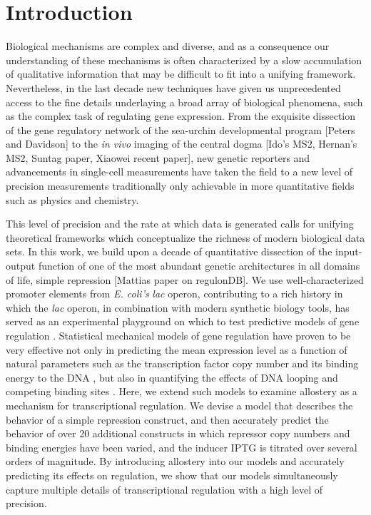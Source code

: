 \section*{Introduction }

Biological mechanisms are complex and diverse, and as a consequence our understanding of these mechanisms is often characterized by a slow accumulation of qualitative information that may be difficult to fit into a unifying framework. Nevertheless, in the last decade new techniques have given us unprecedented access to the fine details underlaying a broad array of biological phenomena, such as the complex task of regulating gene expression. From the exquisite dissection of the gene regulatory
network of the sea-urchin developmental program [Peters and Davidson] to the
\textit{in vivo} imaging of the central dogma [Ido's MS2, Hernan's MS2, Suntag
paper, Xiaowei recent paper], new genetic reporters and  advancements in
single-cell measurements have taken the field to a new level of precision
measurements traditionally only achievable in more quantitative fields such as
physics and chemistry.

This level of precision and the rate at which data is generated calls for
unifying theoretical frameworks which conceptualize the richness of modern
biological data sets. In this work, we build upon a decade of quantitative
dissection of the input-output function of one of the most abundant genetic
architectures in all domains of life, simple repression [Mattias paper on
regulonDB]. We use well-characterized promoter elements from \textit{E. coli's} \textit{lac} operon, contributing to a rich history in which the \textit{lac} operon, in combination with modern synthetic biology
tools, has served as an experimental playground on which to test predictive
models of gene regulation \cite{bintu2005, bintu2005a, Garcia2011}. Statistical mechanical models of gene regulation have
proven to be very effective not only in predicting the mean expression level as a
function of natural parameters such as the transcription factor copy number and
its binding energy to the DNA \cite{Garcia2011}, but also in quantifying the effects of DNA looping
\cite{Boedicker2013a} and competing binding sites \cite{Brewster2014}. Here, we extend such models to examine allostery as a mechanism for transcriptional regulation. We devise a model that describes the behavior of a simple repression construct, and then accurately predict the behavior of over 20 additional constructs in which repressor copy numbers and binding energies have been varied, and the inducer IPTG is titrated over several orders of magnitude. By introducing allostery into our models and accurately predicting its effects on regulation, we show that our models simultaneously capture multiple details of transcriptional regulation with a high level of precision.

